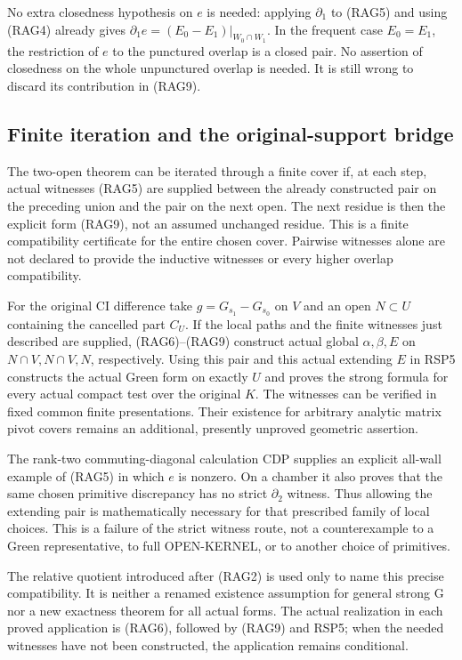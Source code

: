 No extra closedness hypothesis on $e$ is needed: applying
$\partial_1$ to (RAG5) and using (RAG4) already gives
$\partial_1e=(E_0-E_1)|_{W_0\cap W_1}$.  In the frequent
case $E_0=E_1$, the restriction of $e$ to the punctured
overlap is a closed pair.  No assertion of closedness on
the whole unpunctured overlap is needed.  It is still wrong
to discard its contribution in (RAG9).

\subsection{Finite iteration and the original-support bridge}

The two-open theorem can be iterated through a finite
cover if, at each step, actual witnesses (RAG5) are supplied
between the already constructed pair on the preceding
union and the pair on the next open.  The next residue is
then the explicit form (RAG9), not an assumed unchanged
residue.  This is a finite compatibility certificate for
the entire chosen cover.  Pairwise witnesses alone are not
declared to provide the inductive witnesses or every higher
overlap compatibility.

For the original CI difference take
$g=G_{s_1}-G_{s_0}$ on $V$ and an open $N\subset U$
containing the cancelled part $C_U$.  If the local paths
and the finite witnesses just described are supplied,
(RAG6)--(RAG9) construct actual global $\alpha,\beta,E$
on $N\cap V,N\cap V,N$, respectively.  Using this pair
and this actual extending $E$ in RSP5 constructs the
actual Green form on exactly $U$ and proves the strong
formula for every actual compact test over the original
$K$.  The witnesses can be verified in fixed common
finite presentations.  Their existence for arbitrary
analytic matrix pivot covers remains an additional,
presently unproved geometric assertion.

The rank-two commuting-diagonal calculation CDP supplies
an explicit all-wall example of (RAG5) in which $e$ is
nonzero.  On a chamber it also proves that the same
chosen primitive discrepancy has no strict $\partial_2$
witness.  Thus allowing the extending pair is mathematically
necessary for that prescribed family of local choices.
This is a failure of the strict witness route, not a
counterexample to a Green representative, to full
OPEN-KERNEL, or to another choice of primitives.

The relative quotient introduced after (RAG2) is used
only to name this precise compatibility.  It is neither
a renamed existence assumption for general strong G nor
a new exactness theorem for all actual forms.  The actual
realization in each proved application is (RAG6), followed
by (RAG9) and RSP5; when the needed witnesses have not
been constructed, the application remains conditional.
